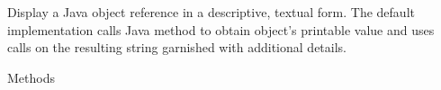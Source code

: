 \begin{Description}\relax
Display a Java object reference in a descriptive, textual form. The
default implementation calls  Java method to obtain
object's printable value and uses calls  on the resulting
string garnished with additional details.
\end{Description}
\begin{Section}{Methods}
\end{Section}

